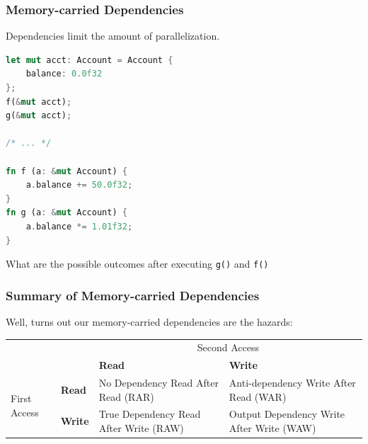 \begin{frame}[fragile]
\frametitle{Memory-carried Dependencies}

Dependencies limit the amount of parallelization.

\begin{lstlisting}[language=Rust]
let mut acct: Account = Account {
    balance: 0.0f32
};
f(&mut acct);
g(&mut acct);

/* ... */

fn f (a: &mut Account) {
    a.balance += 50.0f32;
}
fn g (a: &mut Account) {
    a.balance *= 1.01f32;
}
\end{lstlisting}

What are the possible outcomes after executing {\tt g()} and {\tt f()}


\end{frame}







\begin{frame}
\frametitle{Summary of Memory-carried Dependencies}

Well, turns out our memory-carried dependencies are the hazards:
\begin{center}
\begin{tabular}{ll|p{2.8cm}p{3.2cm}}
& & \multicolumn{2}{c}{Second Access} \\ 
&  & \bf Read & \bf Write \\ \hline
\multirow{2}{*}{First Access} & \bf Read & No Dependency Read After Read (RAR)  & Anti-dependency Write After Read (WAR) \\[0.5em]
& \bf Write & True Dependency Read After Write (RAW) & Output Dependency Write After Write (WAW) \\
\end{tabular}
\end{center}
\end{frame}



